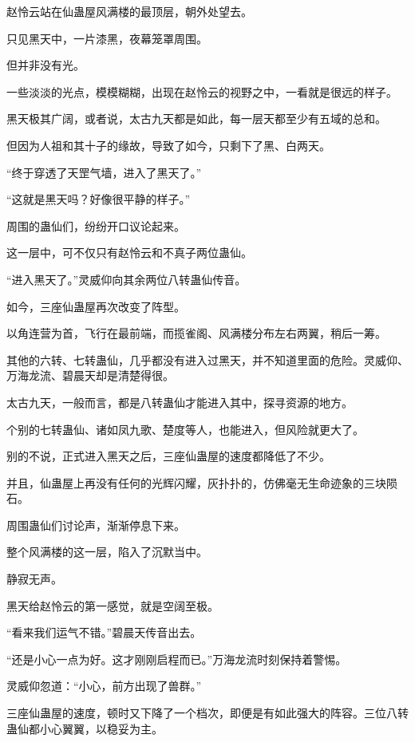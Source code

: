 
\begin{this_body}



赵怜云站在仙蛊屋风满楼的最顶层，朝外处望去。

只见黑天中，一片漆黑，夜幕笼罩周围。

但并非没有光。

一些淡淡的光点，模模糊糊，出现在赵怜云的视野之中，一看就是很远的样子。

黑天极其广阔，或者说，太古九天都是如此，每一层天都至少有五域的总和。

但因为人祖和其十子的缘故，导致了如今，只剩下了黑、白两天。

“终于穿透了天罡气墙，进入了黑天了。”

“这就是黑天吗？好像很平静的样子。”

周围的蛊仙们，纷纷开口议论起来。

这一层中，可不仅只有赵怜云和不真子两位蛊仙。

“进入黑天了。”灵威仰向其余两位八转蛊仙传音。

如今，三座仙蛊屋再次改变了阵型。

以角连营为首，飞行在最前端，而揽雀阁、风满楼分布左右两翼，稍后一筹。

其他的六转、七转蛊仙，几乎都没有进入过黑天，并不知道里面的危险。灵威仰、万海龙流、碧晨天却是清楚得很。

太古九天，一般而言，都是八转蛊仙才能进入其中，探寻资源的地方。

个别的七转蛊仙、诸如凤九歌、楚度等人，也能进入，但风险就更大了。

别的不说，正式进入黑天之后，三座仙蛊屋的速度都降低了不少。

并且，仙蛊屋上再没有任何的光辉闪耀，灰扑扑的，仿佛毫无生命迹象的三块陨石。

周围蛊仙们讨论声，渐渐停息下来。

整个风满楼的这一层，陷入了沉默当中。

静寂无声。

黑天给赵怜云的第一感觉，就是空阔至极。

“看来我们运气不错。”碧晨天传音出去。

“还是小心一点为好。这才刚刚启程而已。”万海龙流时刻保持着警惕。

灵威仰忽道：“小心，前方出现了兽群。”

三座仙蛊屋的速度，顿时又下降了一个档次，即便是有如此强大的阵容。三位八转蛊仙都小心翼翼，以稳妥为主。


\end{this_body}
